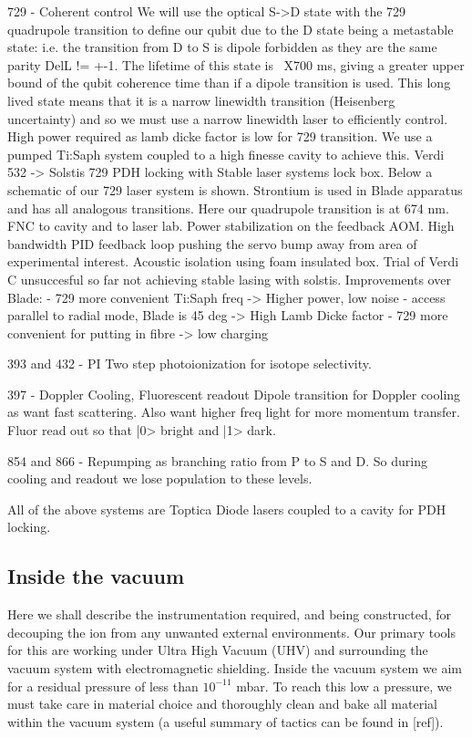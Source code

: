 \documentclass[12pt]{iopart}
\begin{document}
729 - Coherent control
We will use the optical S->D state with the 729 quadrupole transition
to define our qubit due to the D state being a metastable state:
i.e. the transition from D to S is dipole forbidden as they are the
same parity DelL != +-1. The lifetime of this state is ~X700 ms,
giving a greater upper bound of the qubit coherence time than if a
dipole transition is used. This long lived state means that it is a
narrow linewidth transition (Heisenberg uncertainty) and so we must
use a narrow linewidth laser to efficiently control.  High power
required as lamb dicke factor is low for 729 transition.  We use a
pumped Ti:Saph system coupled to a high finesse cavity to achieve
this.  Verdi 532 -> Solstis 729 PDH locking with Stable laser systems
lock box. Below a schematic of our 729 laser system is
shown. Strontium is used in Blade apparatus and has all analogous
transitions. Here our quadrupole transition is at 674 nm.  FNC to
cavity and to laser lab. Power stabilization on the feedback AOM. High
bandwidth PID feedback loop pushing the servo bump away from area of
experimental interest. Acoustic isolation using foam insulated box.
Trial of Verdi C unsuccesful so far not achieving stable lasing with
solstis.
Improvements over Blade:
- 729 more convenient Ti:Saph freq -> Higher power, low noise
- access parallel to radial mode, Blade is 45 deg -> High Lamb Dicke
factor
- 729 more convenient for putting in fibre -> low charging


393 and 432 - PI 
Two step photoionization for isotope selectivity.

397 - Doppler Cooling, Fluorescent readout
Dipole transition for Doppler cooling as want fast scattering. Also
want higher freq light for more momentum transfer.
Fluor read out so that |0> bright and |1> dark.

854 and 866 - Repumping as branching ratio from P to S and D. So
during cooling and readout we lose population to these levels.

All of the above systems are Toptica Diode lasers coupled to a cavity
for PDH locking.


\subsection{Inside the vacuum}

Here we shall describe the instrumentation required, and being
constructed, for decouping the ion from any unwanted external
environments. Our primary tools for this are working under Ultra High
Vacuum (UHV) and surrounding the vacuum system with electromagnetic
shielding. Inside the vacuum system we aim for a residual pressure of
less than $10^{-11}$ mbar. To reach this low a pressure, we must take
care in material choice and thoroughly clean and bake all material
within the vacuum system (a useful summary of tactics can be found in [ref]).
\end{document}
